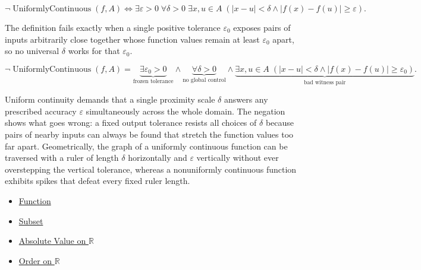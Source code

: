 \begin{remark*}
\[
\neg \operatorname{UniformlyContinuous}(f,A) \Longleftrightarrow \exists \varepsilon > 0 \; \forall \delta > 0 \; \exists x,u \in A \; (|x-u| < \delta \land |f(x)-f(u)| \ge \varepsilon).
\]
\end{remark*}

\begin{remark*}
The definition fails exactly when a single positive tolerance $\varepsilon_{0}$ exposes pairs of inputs arbitrarily close together whose function values remain at least $\varepsilon_{0}$ apart, so no universal $\delta$ works for that $\varepsilon_{0}$.
\end{remark*}

\begin{remark*}
\[
\neg \operatorname{UniformlyContinuous}(f,A)
=
\underbrace{\exists \varepsilon_{0} > 0}_{\text{frozen tolerance}}
\land
\underbrace{\forall \delta > 0}_{\text{no global control}}
\land
\underbrace{\exists x,u \in A \; (|x-u| < \delta \land |f(x)-f(u)| \ge \varepsilon_{0})}_{\text{bad witness pair}}.
\]
\end{remark*}





\begin{remark*}[Interpretation]
Uniform continuity demands that a single proximity scale $\delta$ answers any prescribed accuracy $\varepsilon$ simultaneously across the whole domain. The negation shows what goes wrong: a fixed output tolerance resists all choices of $\delta$ because pairs of nearby inputs can always be found that stretch the function values too far apart. Geometrically, the graph of a uniformly continuous function can be traversed with a ruler of length $\delta$ horizontally and $\varepsilon$ vertically without ever overstepping the vertical tolerance, whereas a nonuniformly continuous function exhibits spikes that defeat every fixed ruler length.
\end{remark*}

\begin{dependencies}
\begin{itemize}
  \item \hyperref[def:function]{Function}
  \item \hyperref[def:subset]{Subset}
  \item \hyperref[def:real-chapter-absolute-value-on-r]{Absolute Value on $\mathbb{R}$}
  \item \hyperref[def:order-on-r]{Order on $\mathbb{R}$}
\end{itemize}
\end{dependencies}

